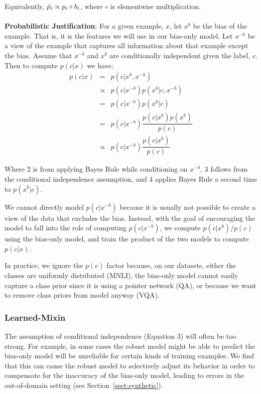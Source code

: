 \documentclass[11pt,a4paper]{article}
\begin{document}
 Equivalently, $\hat{p_i} \propto p_i \circ b_i$, where $\circ$ is elementwise multiplication.
\\
\\ \noindent
\textbf{Probabilistic Justification}:
For a given example, $x$, let $x^b$ be the bias of the example. That is, it is the features we will use in our bias-only model. Let $x^{-b}$ be a view of the example that captures all information about that example except the bias. Assume that $x^{-b}$ and $x^b$ are conditionally independent given the label, $c$. Then to compute $p(c|x)$ we have:
\begin{eqnarray}
p(c|x) & = & p(c|x^b, x^{-b})  \\
&\propto& p(c|x^{-b}) p(x^b|c,x^{-b})  \\
&= & p(c|x^{-b}) p(x^b|c) \\
&= &p(c|x^{-b})\dfrac{p(c|x^b)p(x^b)}{p(c)} \\
&\propto&p(c|x^{-b})\dfrac{p(c|x^b)}{p(c)}
\end{eqnarray}

Where 2 is from applying Bayes Rule while conditioning on $x^{-b}$, 3 follows from the conditional independence assumption, and 4 applies Bayes Rule a second time to $p(x^b|c)$.

We cannot directly model $p(c|x^{-b})$ because it is usually not possible to create a view of the data that excludes the bias. 
Instead, with the goal of encouraging the model to fall into the role of computing $p(c|x^{-b})$, we compute ${p(c|x^b)}/{p(c)}$ using the bias-only model, and train the product of the two models to compute $p(c|x)$. 

In practice, we ignore the $p(c)$ factor because, on our datasets, either the classes are uniformly distributed (MNLI), the bias-only model cannot easily capture a class prior since it is using a pointer network (QA), or because we want to remove class priors from model anyway (VQA).

\subsubsection{Learned-Mixin}
The assumption of conditional independence (Equation 3) will often be too strong.
For example, in some cases the robust model might be able to predict the bias-only model will be unreliable for certain kinds of training examples.
We find that this can cause the robust model to selectively adjust its behavior in order to compensate for the inaccuracy of the bias-only model, leading to errors in the out-of-domain setting (see Section~\ref{sect:synthetic}).
\end{document}
